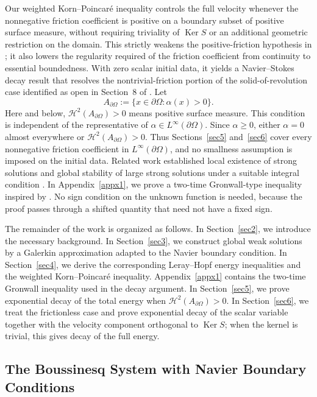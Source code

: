 \documentclass[11pt,reqno]{amsart}
\theoremstyle{plain}
\numberwithin{equation}{section}
\DeclareMathOperator{\kernel}{Ker}
\begin{document}
Our weighted Korn--Poincar\'e inequality controls the full velocity whenever the nonnegative friction coefficient is positive on a boundary subset of positive surface measure, without requiring triviality of $\kernel S$ or an additional geometric restriction on the domain. This strictly weakens the positive-friction hypothesis in \cite{Kelliher2025}; it also lowers the regularity required of the friction coefficient from continuity to essential boundedness. With zero scalar initial data, it yields a Navier--Stokes decay result that resolves the nontrivial-friction portion of the solid-of-revolution case identified as open in Section~8 of \cite{Kelliher2025}. Let
\[
A_{\partial\Omega}:=\{x\in\partial\Omega:\alpha(x)>0\}.
\]
Here and below, $\mathcal H^2(A_{\partial\Omega})>0$ means positive surface measure. This condition is independent of the representative of $\alpha\in L^\infty(\partial\Omega)$. Since $\alpha\ge0$, either $\alpha=0$ almost everywhere or $\mathcal H^2(A_{\partial\Omega})>0$. Thus Sections~\ref{sec5} and~\ref{sec6} cover every nonnegative friction coefficient in $L^\infty(\partial\Omega)$, and no smallness assumption is imposed on the initial data. Related work established local existence of strong solutions and global stability of large strong solutions under a suitable integral condition \cite{W3}. In Appendix~\ref{appx1}, we prove a two-time Gronwall-type inequality inspired by \cite[Appendix A]{Kelliher2025}. No sign condition on the unknown function is needed, because the proof passes through a shifted quantity that need not have a fixed sign.

The remainder of the work is organized as follows. In Section~\ref{sec2}, we introduce the necessary background. In Section~\ref{sec3}, we construct global weak solutions by a Galerkin approximation adapted to the Navier boundary condition. In Section~\ref{sec4}, we derive the corresponding Leray--Hopf energy inequalities and the weighted Korn--Poincar\'e inequality. Appendix~\ref{appx1} contains the two-time Gronwall inequality used in the decay argument. In Section~\ref{sec5}, we prove exponential decay of the total energy when $\mathcal H^2(A_{\partial\Omega})>0$. In Section~\ref{sec6}, we treat the frictionless case and prove exponential decay of the scalar variable together with the velocity component orthogonal to $\kernel S$; when the kernel is trivial, this gives decay of the full energy.


\subsection{The Boussinesq System with Navier Boundary Conditions}
\end{document}
